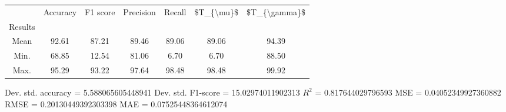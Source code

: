 \begin{tabular}{|c|c|c|c|c|c|c|}
\toprule
{} &  Accuracy &  F1 score &  Precision &  Recall &  \$T\_\{\textbackslash mu\}\$ &  \$T\_\{\textbackslash gamma\}\$ \\
Results &           &           &            &         &            &               \\
\hline
Mean    &     92.61 &     87.21 &      89.46 &   89.06 &      89.06 &         94.39 \\
Min.    &     68.85 &     12.54 &      81.06 &    6.70 &       6.70 &         88.50 \\
Max.    &     95.29 &     93.22 &      97.64 &   98.48 &      98.48 &         99.92 \\
\bottomrule
\end{tabular}

 Dev. std. accuracy = 5.588065605448941
 Dev. std. F1-score = 15.02974011902313
 $R^2$ = 0.817644029796593
 MSE = 0.04052349927360882
 RMSE = 0.20130449392303398
 MAE = 0.07525448364612074